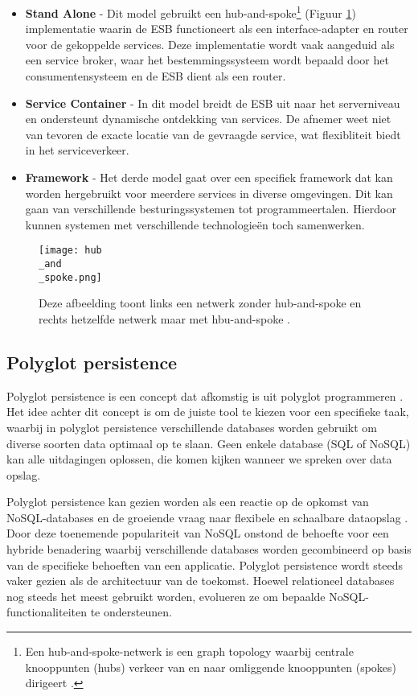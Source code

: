 \begin{itemize}
	\item \textbf{Stand Alone} - Dit model gebruikt een hub-and-spoke\footnote{Een hub-and-spoke-netwerk is een graph topology waarbij centrale knooppunten (hubs) verkeer van en naar omliggende knooppunten (spokes) dirigeert \autocite{Khosravi2024}.} (Figuur \ref{fig:hub-and-spoke}) implementatie waarin de ESB functioneert als een interface-adapter en router voor de gekoppelde services. Deze implementatie wordt vaak aangeduid als een service broker, waar het bestemmingssysteem wordt bepaald door het consumentensysteem en de ESB dient als een router.
	\item \textbf{Service Container} - In dit model breidt de ESB uit naar het serverniveau en ondersteunt dynamische ontdekking van services. De afnemer weet niet van tevoren de exacte locatie van de gevraagde service, wat flexibliteit biedt in het serviceverkeer.
	\item \textbf{Framework} - Het derde model gaat over een specifiek framework dat kan worden hergebruikt voor meerdere services in diverse omgevingen. Dit kan gaan van verschillende besturingssystemen tot programmeertalen. Hierdoor kunnen systemen met verschillende technologieën toch samenwerken.
\end{itemize}

\begin{figure}[H]
	\centering
	\texttt{[image: hub\\\_and\\\_spoke.png]}
	\caption[Voorstelling van een hub-and-spoke]{\label{fig:hub-and-spoke}Deze afbeelding toont links een netwerk zonder hub-and-spoke en rechts hetzelfde netwerk maar met hbu-and-spoke \autocite{Zhou2021}.}
\end{figure}

\subsection{Polyglot persistence}
\label{sec:Polyglot Persistence}

Polyglot persistence is een concept dat afkomstig is uit polyglot programmeren \autocite{Kazanavicius2022}. Het idee achter dit concept is om de juiste tool te kiezen voor een specifieke taak, waarbij in polyglot persistence verschillende databases worden gebruikt om diverse soorten data optimaal op te slaan. Geen enkele database (SQL of NoSQL) kan alle uitdagingen oplossen, die komen kijken wanneer we spreken over data opslag.

Polyglot persistence kan gezien worden als een reactie op de opkomst van NoSQL-databases en de groeiende vraag naar flexibele en schaalbare dataopslag \autocite{Candel2022}. Door deze toenemende populariteit van NoSQL onstond de behoefte voor een hybride benadering waarbij verschillende databases worden gecombineerd op basis van de specifieke behoeften van een applicatie. Polyglot persistence wordt steeds vaker gezien als de architectuur van de toekomst. Hoewel relationeel databases nog steeds het meest gebruikt worden, evolueren ze om bepaalde NoSQL-functionaliteiten te ondersteunen.

